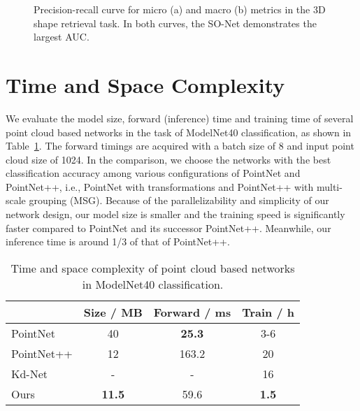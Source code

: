 \documentclass[10pt,twocolumn,letterpaper]{article}
\begin{document}
\begin{figure*}[th]
        \centering
        \caption{Precision-recall curve for micro (a) and macro (b) metrics in the 3D shape retrieval task. In both curves, the SO-Net demonstrates the largest AUC.}
        \label{fig_shrec16_pr}
        \vspace{-4pt}
\end{figure*}



\section{Time and Space Complexity} \label{sec_time_space}
We evaluate the model size, forward (inference) time and training time of several point cloud based networks in the task of ModelNet40 classification, as shown in Table~\ref{tbl_time_space}. The forward timings are acquired with a batch size of 8 and input point cloud size of 1024. In the comparison, we choose the networks with the best classification accuracy among various configurations of PointNet and PointNet++, i.e., PointNet with transformations and PointNet++ with multi-scale grouping (MSG). Because of the parallelizability and simplicity of our network design, our model size is smaller and the training speed is significantly faster compared to PointNet and its successor PointNet++. Meanwhile, our inference time is around 1/3 of that of PointNet++.

\begin{table}[t!]
\centering
{
\setlength\tabcolsep{6pt} \begin{tabular}{l|ccc}
\hline
                                    & Size / MB       & Forward / ms      & Train / h                    \\ \hline
PointNet \cite{qi2016pointnet}      & 40            & \textbf{25.3}   & 3-6                        \\
PointNet++ \cite{qi2017pointnet++}  & 12            & 163.2           & 20                         \\
Kd-Net \cite{klokov2017escape}      & -             & -               & 16                         \\ \hline
Ours                                & \textbf{11.5} & 59.6            & \textbf{1.5}                 \\ \hline
\end{tabular}
}
\caption{Time and space complexity of point cloud based networks in ModelNet40 classification. }
\label{tbl_time_space}
\vspace{-4pt}
\end{table}
\end{document}
